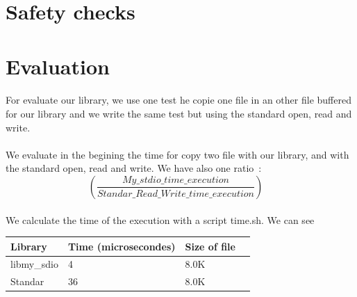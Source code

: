 \documentclass[a4paper,10pt]{article}
\begin{document}
\section{Safety checks}

\section{Evaluation}
\paragraph{}
For evaluate our library, we use one test he copie one file in an
other file buffered for our library and we write the same test 
but using the standard open, read and write.
\paragraph{}
We evaluate in the begining the time for copy two file with our library, 
and with the standard open, read and write. We have also one ratio~: 
\begin{equation}
\left(\frac{My\_stdio\_time\_execution}{Standar\_Read\_Write\_time\_execution} \right)  \quad
\end{equation}
\paragraph{}
We calculate the time of the execution with a script time.sh. We can see

\begin{tabular}{|R{2cm}|C{2cm}|L{1.5cm}|L{1.5cm}|}
\hline {}Library & Time (microsecondes) & Size of file\\
\hline  libmy\_sdio & 4 & 8.0K \\
\hline  Standar  & 36 & 8.0K \\
\hline 
\end{tabular}
\end{document}
